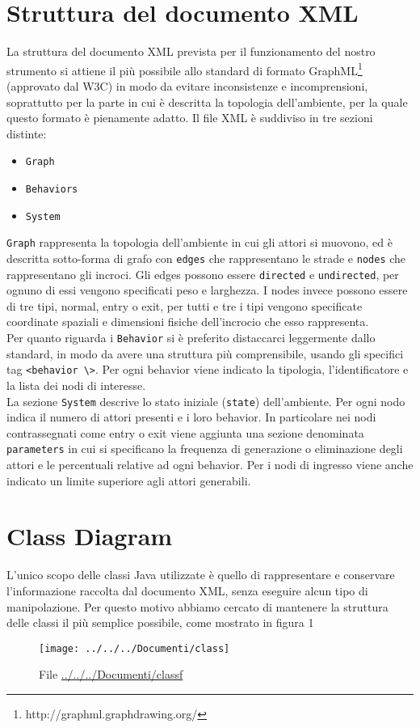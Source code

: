 \section{Struttura del documento XML}
La struttura del documento XML prevista per il funzionamento del nostro strumento si attiene il più possibile allo standard di formato GraphML\footnote{http://graphml.graphdrawing.org/} (approvato dal W3C) in modo da evitare inconsistenze e incomprensioni, soprattutto per la parte in cui è descritta la topologia dell'ambiente, per la quale questo formato è pienamente adatto.
Il file XML è suddiviso in tre sezioni distinte:
\begin{itemize}
\item \texttt{Graph}
\item \texttt{Behaviors}
\item \texttt{System}
\end{itemize} 
\texttt{Graph} rappresenta la topologia dell'ambiente in cui gli attori si muovono, ed è descritta sotto-forma di grafo con \texttt{edges} che rappresentano le strade e \texttt{nodes} che rappresentano gli incroci. Gli edges possono essere \texttt{directed} e \texttt{undirected}, per ognuno di essi vengono specificati peso e larghezza. I nodes invece possono essere di tre tipi, normal, entry o exit, per tutti e tre i tipi vengono specificate coordinate spaziali e dimensioni fisiche dell'incrocio che esso rappresenta.\\
Per quanto riguarda i \texttt{Behavior} si è preferito distaccarci leggermente dallo standard, in modo da avere una struttura più comprensibile, usando gli specifici tag \texttt{<behavior \textbackslash>}. Per ogni behavior viene indicato la tipologia, l'identificatore e la lista dei nodi di interesse.\\
La sezione \texttt{System} descrive lo stato iniziale (\texttt{state}) dell'ambiente. Per ogni nodo indica il numero di attori presenti e i loro behavior. In particolare nei nodi contrassegnati come entry o exit viene aggiunta una sezione denominata \texttt{parameters} in cui si specificano la frequenza di generazione o eliminazione degli attori e le percentuali relative ad ogni behavior. Per i nodi di ingresso viene anche indicato un limite superiore agli attori generabili.

\section{Class Diagram}
L'unico scopo delle classi Java utilizzate è quello di rappresentare e conservare l'informazione raccolta dal documento XML, senza eseguire alcun tipo di manipolazione. Per questo motivo abbiamo cercato di mantenere la struttura delle classi il più semplice possibile, come mostrato in figura 1
\begin{figure}[htbp]
\centering
\texttt{[image: ../../../Documenti/class]}
\caption{File \protect\url{../../../Documenti/classf}\label{fig:class-diagram}}
\end{figure}
